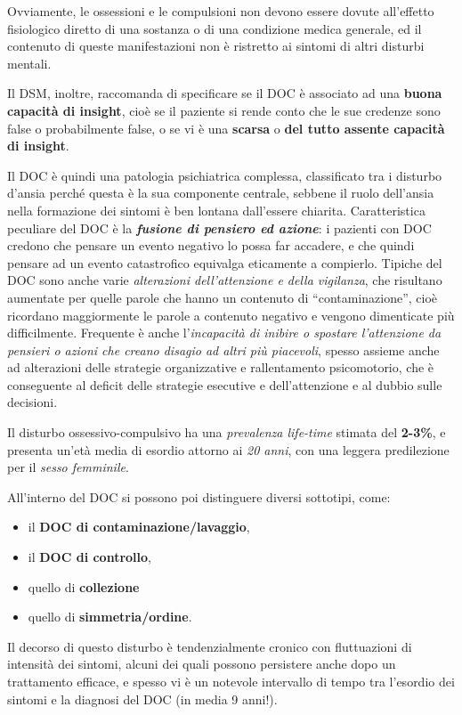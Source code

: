 \documentclass[]{article}
\begin{document}
Ovviamente, le ossessioni e le compulsioni non devono essere dovute
all'effetto fisiologico diretto di una sostanza o di una condizione
medica generale, ed il contenuto di queste manifestazioni non è
ristretto ai sintomi di altri disturbi mentali.

Il DSM, inoltre, raccomanda di specificare se il DOC è associato ad una
\textbf{buona capacità di insight}, cioè se il paziente si rende conto
che le sue credenze sono false o probabilmente false, o se vi è una
\textbf{scarsa} o \textbf{del tutto assente capacità di insight}.

Il DOC è quindi una patologia psichiatrica complessa, classificato tra i
disturbo d'ansia perché questa è la sua componente centrale, sebbene il
ruolo dell'ansia nella formazione dei sintomi è ben lontana dall'essere
chiarita. Caratteristica peculiare del DOC è la \textbf{\emph{fusione di
pensiero ed azione}}: i pazienti con DOC credono che pensare un evento
negativo lo possa far accadere, e che quindi pensare ad un evento
catastrofico equivalga eticamente a compierlo. Tipiche del DOC sono
anche varie \emph{alterazioni dell'attenzione e della vigilanza}, che
risultano aumentate per quelle parole che hanno un contenuto di
``contaminazione'', cioè ricordano maggiormente le parole a contenuto
negativo e vengono dimenticate più difficilmente. Frequente è anche
l'\emph{incapacità di inibire o spostare l'attenzione da pensieri o
azioni che creano disagio ad altri più piacevoli}, spesso assieme anche
ad alterazioni delle strategie organizzative e rallentamento
psicomotorio, che è conseguente al deficit delle strategie esecutive e
dell'attenzione e al dubbio sulle decisioni.

Il disturbo ossessivo-compulsivo ha una \emph{prevalenza life-time}
stimata del \textbf{2-3\%}, e presenta un'età media di esordio attorno
ai \emph{20 anni}, con una leggera predilezione per il \emph{sesso
femminile}.

All'interno del DOC si possono poi distinguere diversi sottotipi, come:

\begin{itemize}
\item
  il \textbf{DOC di contaminazione/lavaggio},
\item
  il \textbf{DOC di controllo},
\item
  quello di \textbf{collezione}
\item
  quello di \textbf{simmetria/ordine}.
\end{itemize}

Il decorso di questo disturbo è tendenzialmente cronico con fluttuazioni
di intensità dei sintomi, alcuni dei quali possono persistere anche dopo
un trattamento efficace, e spesso vi è un notevole intervallo di tempo
tra l'esordio dei sintomi e la diagnosi del DOC (in media 9 anni!).
\end{document}
